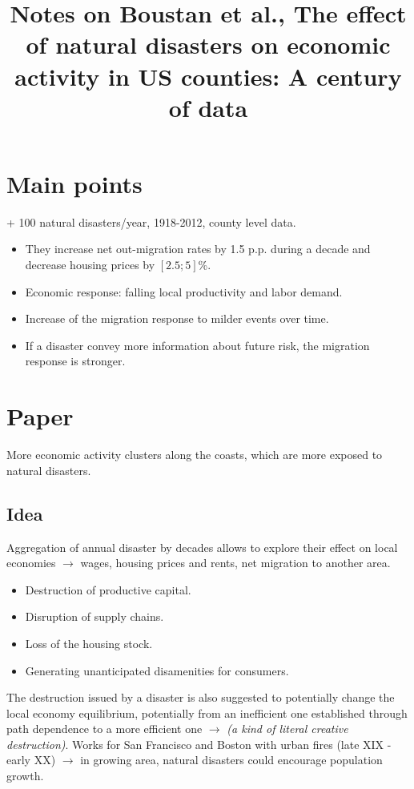 \documentclass[11pt, oneside]{article}   	%
\title{Notes on Boustan et al., The eﬀect of natural disasters on economic activity in US counties: A century of data}
\begin{document}
\maketitle

\section{Main points}
+ 100 natural disasters/year, 1918-2012, county level data. 
\begin{itemize}
    \item They increase net out-migration rates by 1.5 p.p. during a decade and decrease housing prices by $[2.5 ; 5]$\%.
    \item Economic response: falling local productivity and labor demand.
    \item Increase of the migration response to milder events over time. 
    \item If a disaster convey more information about future risk, the migration response is stronger.
\end{itemize}

\section{Paper}
More economic activity clusters along the coasts, which are more exposed to natural disasters.

\subsection{Idea}
Aggregation of annual disaster by decades allows to explore their effect on local economies $\to$ wages, housing prices and rents, net migration to another area.
\begin{itemize}
    \item Destruction of productive capital.
    \item Disruption of supply chains.
    \item Loss of the housing stock. 
    \item Generating unanticipated disamenities for consumers.
\end{itemize}

The destruction issued by a disaster is also suggested to potentially change the local economy equilibrium, potentially from an inefficient one established through path dependence to a more efficient one $\to$ \textit{(a kind of literal creative destruction)}. Works for San Francisco and Boston with urban fires (late XIX - early XX) $\to$ in growing area, natural disasters could encourage population growth. 
\end{document}
